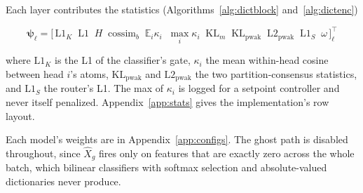 Each layer contributes the statistics (Algorithms~\ref{alg:dictblock}
and~\ref{alg:dictenc})

\begin{equation}
	\boldsymbol{\psi}_\ell = \big[\,
	\mathrm{L1}_K \;\; \mathrm{L1} \;\; H \;\; \mathrm{cossim}_b \;\;
	\mathbb{E}_i\kappa_i \;\; \max_i \kappa_i \;\;
	\mathrm{KL}_m \;\; \mathrm{KL}_{\mathrm{pwak}} \;\; \mathrm{L2}_{\mathrm{pwak}}
	\;\; \mathrm{L1}_S \;\; \omega
	\,\big]^{\top}_\ell
	\label{eq:stats}
\end{equation}

where $\mathrm{L1}_K$ is the L1 of the classifier's gate, $\kappa_i$ the
mean within-head cosine between head $i$'s atoms,
$\mathrm{KL}_{\mathrm{pwak}}$ and $\mathrm{L2}_{\mathrm{pwak}}$ the two
partition-consensus statistics, and $\mathrm{L1}_S$ the router's L1. The
max of $\kappa_i$ is logged for a setpoint controller and never itself
penalized. Appendix~\ref{app:stats} gives the implementation's row
layout.

Each model's weights are in Appendix~\ref{app:configs}. The ghost path
is disabled throughout, since $\hat{X}_g$ fires only on features that
are exactly zero across the whole batch, which bilinear classifiers with
softmax selection and absolute-valued dictionaries never produce.



